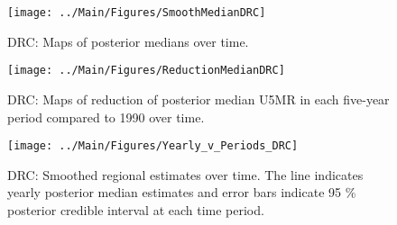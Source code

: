 \documentclass[12pt]{article}\usepackage[]{graphicx}\usepackage[]{color}
\newenvironment{knitrout}{}{} %
\begin{document}
\begin{knitrout}
\color{fgcolor}\begin{figure}[bht]

{\centering \texttt{[image: ../Main/Figures/SmoothMedianDRC]} 

}

\caption[DRC]{DRC: Maps of posterior medians over time.}\label{fig:unnamed-chunk-94}
\end{figure}


\end{knitrout}
\begin{knitrout}
\color{fgcolor}\begin{figure}[bht]

{\centering \texttt{[image: ../Main/Figures/ReductionMedianDRC]} 

}

\caption[DRC]{DRC: Maps of reduction of posterior median U5MR in each five-year period compared to 1990 over time.}\label{fig:unnamed-chunk-95}
\end{figure}


\end{knitrout}
\begin{knitrout}
\color{fgcolor}\begin{figure}[bht]

{\centering \texttt{[image: ../Main/Figures/Yearly\_v\_Periods\_DRC]} 

}

\caption[DRC]{DRC: Smoothed regional estimates over time. The line indicates yearly posterior median estimates and error bars indicate 95 \% posterior credible interval at each time period.}\label{fig:unnamed-chunk-96}
\end{figure}


\end{knitrout}
\end{document}
